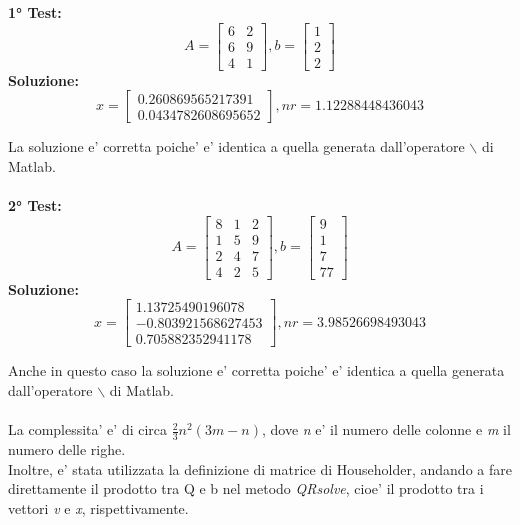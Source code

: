 \documentclass[10pt,a4paper]{article}
\begin{document}
\textbf{1° Test:}
\[
  A =
  \begin{bmatrix}
    6 & 2 \\
    6 & 9 \\
    4 & 1
  \end{bmatrix},
  b =
  \begin{bmatrix}
    1 \\ 2 \\ 2
  \end{bmatrix}
\]
\textbf{Soluzione:}
\[
  x =
  \begin{bmatrix}
    0.260869565217391 \\
    0.0434782608695652
  \end{bmatrix},
  \textit{nr} = 1.12288448436043
\]

La soluzione e' corretta poiche' e' identica a quella generata dall'operatore 
$ \backslash $ di Matlab.
\\ \\
\textbf{2° Test:}
\[
  A =
  \begin{bmatrix}
    8 & 1 & 2 \\
    1 & 5 & 9 \\
    2 & 4 & 7 \\
    4 & 2 & 5
  \end{bmatrix},
  b =
  \begin{bmatrix}
    9 \\ 1 \\ 7 \\ 77
  \end{bmatrix}
\]
\textbf{Soluzione:}
\[
  x =
  \begin{bmatrix}
    1.13725490196078   \\
    -0.803921568627453 \\
    0.705882352941178
  \end{bmatrix},
  \textit{nr} = 3.98526698493043
\]

Anche in questo caso la soluzione e' corretta poiche' e' identica a quella 
generata dall'operatore $ \backslash $ di Matlab.
\\
\\
La complessita' e' di circa $ \frac{2}{ 3}n^2(3m-n) $, dove \textit{n} e' 
il numero delle colonne e \textit{m} il numero delle righe. 
\\
Inoltre, e' stata utilizzata la definizione di matrice di Householder, 
andando a fare direttamente il prodotto tra Q e b nel metodo \textit{QRsolve},
cioe' il prodotto tra i vettori \textit{v} e \textit{x}, rispettivamente. 
\end{document}
